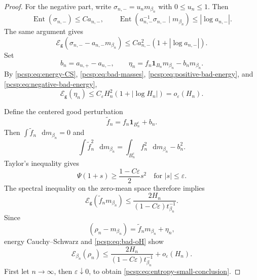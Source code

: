 \documentclass[11pt,reqno]{amsart}
\numberwithin{equation}{section}
\theoremstyle{plain}
\theoremstyle{definition}
\newcommand{\dd}{\mathop{}\!\mathrm d}
\newcommand{\one}{\mathbf 1}
\newcommand{\be}{\beta}
\newcommand{\g}{\mathsf g}
\newcommand{\Ent}{\operatorname{Ent}}
\newcommand{\Ecal}{\mathcal E}
\begin{document}
\begin{proof}
For the negative part, write $\sigma_{n,-}=u_nm_{\be_n}$ with $0\leq u_n\leq1$.  Then
\begin{equation}\label{pcsp:eq:negative-entropy-bounds}
 \Ent(\sigma_{n,-})\leq Ca_{n,-},
 \qquad
 \Ent(a_{n,-}^{-1}\sigma_{n,-}\mid m_{\be_n})
 \leq|\log a_{n,-}|.
\end{equation}
The same argument gives
\begin{equation}\label{pcsp:eq:negative-bad-energy}
 \Ecal_\g(\sigma_{n,-}-a_{n,-}m_{\be_n})
 \leq Ca_{n,-}^2(1+|\log a_{n,-}|).
\end{equation}
Set
\begin{equation}\label{pcsp:eq:bad-centered}
 b_n=a_{n,+}-a_{n,-},
 \qquad
 \eta_n=f_n\one_{B_n}m_{\be_n}-b_nm_{\be_n}.
\end{equation}
By \eqref{pcsp:eq:energy-CS}, \eqref{pcsp:eq:bad-masses}, \eqref{pcsp:eq:positive-bad-energy}, and \eqref{pcsp:eq:negative-bad-energy},
\begin{equation}\label{pcsp:eq:bad-oH}
 \Ecal_\g(\eta_n)
 \leq C_\varepsilon H_n^2(1+|\log H_n|)=o_\varepsilon(H_n).
\end{equation}

Define the centered good perturbation
\begin{equation}\label{pcsp:eq:good-centered}
 \widetilde f_n=f_n\one_{B_n^c}+b_n.
\end{equation}
Then $\int\widetilde f_n\,\dd m_{\be_n}=0$ and
\begin{equation}\label{pcsp:eq:good-L2-identity}
 \int\widetilde f_n^2\,\dd m_{\be_n}
 =\int_{B_n^c}f_n^2\,\dd m_{\be_n}-b_n^2.
\end{equation}
Taylor's inequality gives
\begin{equation}\label{pcsp:eq:Psi-quadratic}
 \Psi(1+s)\geq\frac{1-C\varepsilon}{2}s^2
 \quad\text{for }|s|\leq\varepsilon.
\end{equation}
The spectral inequality on the zero-mean space therefore implies
\begin{equation}\label{pcsp:eq:good-energy-bound}
 \Ecal_\g(\widetilde f_nm_{\be_n})
 \leq\frac{2H_n}{(1-C\varepsilon)t_{\be_n}^{-1}}.
\end{equation}
Since
\begin{equation}\label{pcsp:eq:full-decomposition}
 (\rho_n-m_{\be_n})
 =\widetilde f_nm_{\be_n}+\eta_n,
\end{equation}
energy Cauchy--Schwarz and \eqref{pcsp:eq:bad-oH} show
\begin{equation}\label{pcsp:eq:full-energy-local}
 \Ecal_{\be_n}(\rho_n)
 \leq\frac{2H_n}{(1-C\varepsilon)t_{\be_n}^{-1}}+o_\varepsilon(H_n).
\end{equation}
First let $n\to\infty$, then $\varepsilon\downarrow0$, to obtain \eqref{pcsp:eq:entropy-small-conclusion}.
\end{proof}
\end{document}
